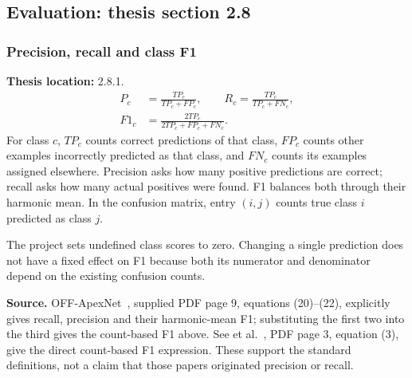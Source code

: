\documentclass[11pt,a4paper]{article}
\numberwithin{equation}{section}
\begin{document}
\subsection{Evaluation: thesis section 2.8}

\subsubsection{Precision, recall and class F1}
\label{fg:metrics}
\textbf{Thesis location:} 2.8.1.
\begin{equation}
\begin{aligned}
    P_c&=\frac{TP_c}{TP_c+FP_c},\qquad
    R_c=\frac{TP_c}{TP_c+FN_c},\\
    F1_c&=\frac{2TP_c}{2TP_c+FP_c+FN_c}.
\end{aligned}
    \label{fg:eq:metrics}
\end{equation}
For class $c$, $TP_c$ counts correct predictions of that class, $FP_c$ counts
other examples incorrectly predicted as that class, and $FN_c$ counts its
examples assigned elsewhere. Precision asks how many positive predictions
are correct; recall asks how many actual positives were found. F1 balances
both through their harmonic mean. In the confusion matrix, entry $(i,j)$
counts true class $i$ predicted as class $j$.

The project sets undefined class scores to zero. Changing a single prediction
does not have a fixed effect on F1 because both its numerator and denominator
depend on the existing confusion counts.

\textbf{Source.} OFF-ApexNet~\cite{liong2019a}, supplied PDF page 9,
equations (20)--(22), explicitly gives recall, precision and their harmonic-mean
F1; substituting the first two into the third gives the count-based F1 above.
See et al.~\cite{see2019}, PDF page 3, equation (3), give the direct count-based
F1 expression. These support the standard definitions, not a claim that those
papers originated precision or recall.
\end{document}
